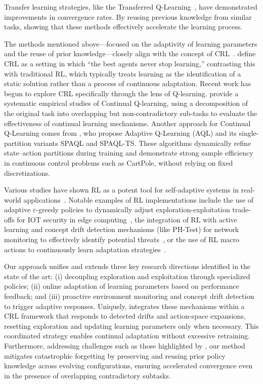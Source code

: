 Transfer learning strategies, like the Transferred Q-Learning~\cite{chen2022transferredqlearning}, 
have demonstrated improvements in convergence rates. By reusing previous knowledge from similar 
tasks, showing that these methods effectively accelerate the learning process.

The methods mentioned above—focused on the adaptivity of learning parameters and the reuse of prior knowledge—closely align with the concept of \ac{CRL}~\cite{khetarpal2022continualreinforcementlearningreview}.
\citet{abel2023definitioncontinualreinforcementlearning} define \ac{CRL} as a setting in which “the best agents never stop learning,” contrasting this with traditional \ac{RL}, which typically treats learning as the identification of a static solution rather than a process of continuous adaptation.
Recent work has begun to explore \ac{CRL} specifically through the lens of Q-learning.
\citet{Bagus2022} provide a systematic empirical studies of Continual Q-learning, using a decomposition of the original task into overlapping but non-contradictory sub-tasks to evaluate the effectiveness of continual learning mechanisms.
Another approach for Continual Q-Learning comes from \citet{araujo2020controladaptiveqlearning}, who propose Adaptive Q-Learning (AQL) and its single-partition variants SPAQL and SPAQL-TS. These algorithms dynamically refine state–action partitions during training and demonstrate strong sample efficiency in continuous control problems such as CartPole, without relying on fixed discretizations.

Various studies have shown \ac{RL} as a potent tool for self-adaptive systems in real-world 
applications~\cite{HENRICHS2022106940}. Notable examples of \ac{RL} implementations 
include the use of adaptive $\varepsilon$-greedy policies to dynamically adjust exploration-exploitation 
trade-offs for \ac{IOT} security in edge computing~\cite{iotdynamicrl}, the integration of \ac{RL} 
with active learning and concept drift detection mechanisms (like PH-Test) for network monitoring to 
effectively identify potential threats~\cite{networkdynamicrl}, or the use of \ac{RL} macro actions to 
continuously learn adaptation strategies~\cite{cardozo23}.

Our approach unifies and extends three key research directions identified in the state of the art: (i) decoupling exploration and exploitation through specialized policies; (ii) online adaptation of learning parameters based on performance feedback; and (iii) proactive environment monitoring and concept drift detection to trigger adaptive responses. Uniquely, \adaptiverl integrates these mechanisms within a \ac{CRL} framework that responds to detected drifts and action-space expansions, resetting exploration and updating learning parameters only when necessary. This coordinated strategy enables continual adaptation without excessive retraining. Furthermore, addressing challenges such as those highlighted by \citet{Bagus2022}, our method mitigates catastrophic forgetting by preserving and reusing prior policy knowledge across evolving configurations, ensuring accelerated convergence even in the presence of overlapping contradictory subtasks.  

\endinput
